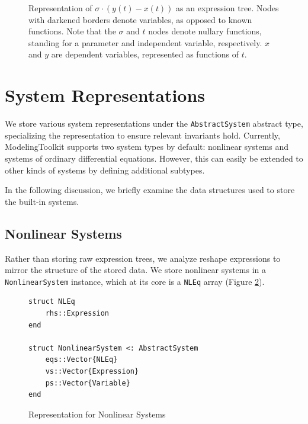 \documentclass{juliacon}
\begin{document}
\begin{figure}
    \centering
    \caption{Representation of $\sigma \cdot (y(t) - x(t))$ as an expression tree. Nodes with darkened borders denote variables, as opposed to known functions. Note that the $\sigma$ and $t$ nodes denote nullary functions, standing for a parameter and independent variable, respectively. $x$ and $y$ are dependent variables, represented as functions of $t$.}
    \label{fig:exprtree}
\end{figure}


\section{System Representations \label{sec:system}}

We store various system representations under the \texttt{AbstractSystem} abstract type, specializing the representation to ensure relevant invariants hold. Currently, ModelingToolkit supports two system types by default: nonlinear systems and systems of ordinary differential equations. However, this can easily be extended to other kinds of systems by defining additional subtypes.

In the following discussion, we briefly examine the data structures used to store the built-in systems.


\subsection{Nonlinear Systems}

Rather than storing raw expression trees, we analyze reshape expressions to mirror the structure of the stored data. We store nonlinear systems in a \texttt{NonlinearSystem} instance, which at its core is a \texttt{NLEq} array (Figure \ref{code:nlsys}).

\begin{figure}[tbh!]
\begin{lstlisting}
struct NLEq
    rhs::Expression
end

struct NonlinearSystem <: AbstractSystem
    eqs::Vector{NLEq}
    vs::Vector{Expression}
    ps::Vector{Variable}
end
\end{lstlisting}
\caption{Representation for Nonlinear Systems}
\label{code:nlsys}
\end{figure}
\end{document}
